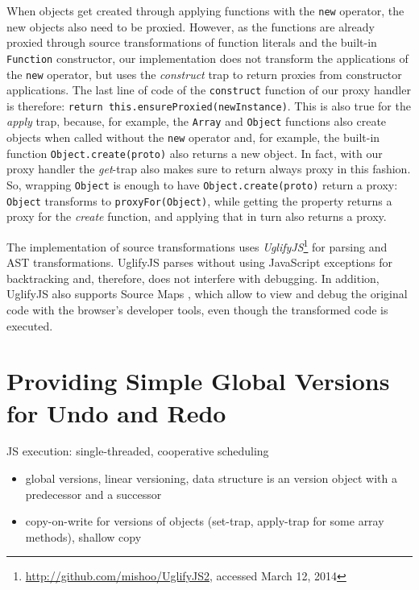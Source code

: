 When objects get created through applying functions with the \lstinline{new} operator, the new objects also need to be proxied.
However, as the functions are already proxied through source transformations of function literals and the built-in \lstinline{Function} constructor, our implementation does not transform the applications of the \lstinline{new} operator, but uses the \emph{construct} trap to return proxies from constructor applications.
The last line of code of the \lstinline{construct} function of our proxy handler is therefore: \lstinline{return this.ensureProxied(newInstance)}.
This is also true for the \emph{apply} trap, because, for example, the \lstinline{Array} and \lstinline{Object} functions also create objects when called without the \lstinline{new} operator and, for example, the built-in function \lstinline{Object.create(proto)} also returns a new object.
In fact, with our proxy handler the \emph{get}-trap also makes sure to return always proxy in this fashion.
So, wrapping \lstinline{Object} is enough to have \lstinline{Object.create(proto)} return a proxy: \lstinline{Object} transforms to \lstinline{proxyFor(Object)}, while getting the property returns a proxy for the \emph{create} function, and applying that in turn also returns a proxy.

The implementation of source transformations uses \emph{UglifyJS}\footnote{\url{http://github.com/mishoo/UglifyJS2}, accessed March 12, 2014} for parsing and AST transformations.
UglifyJS parses without using JavaScript exceptions for backtracking and, therefore, does not interfere with debugging.
In addition, UglifyJS also supports Source Maps , which allow to view and debug the original code with the browser's developer tools, even though the transformed code is executed.



\section{Providing Simple Global Versions for Undo and Redo} \label{sec:IMPLEMENTATION:3}

JS execution: single-threaded, cooperative scheduling 

\begin{itemize}
    \item global versions, linear versioning, data structure is an version object with a predecessor and a successor
    \item copy-on-write for versions of objects (set-trap, apply-trap for some array methods), shallow copy
\end{itemize}


